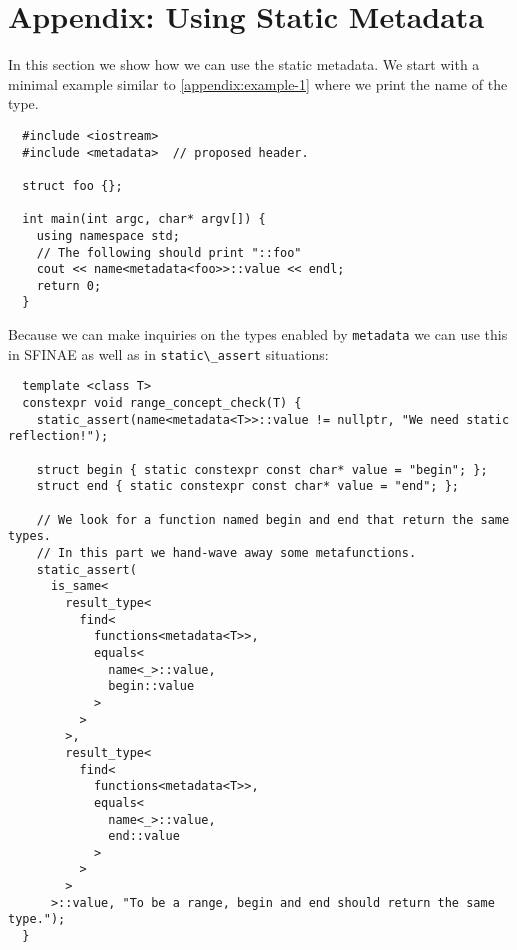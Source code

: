 \section{Appendix: Using Static Metadata}
\label{appendix:example-2}

In this section we show how we can use the static metadata. We start with a minimal example similar to \autoref{appendix:example-1} where we print the name of the type.

\begin{verbatim}
  #include <iostream>
  #include <metadata>  // proposed header.
  
  struct foo {};
  
  int main(int argc, char* argv[]) {
    using namespace std;
    // The following should print "::foo"
    cout << name<metadata<foo>>::value << endl;
    return 0;
  }
\end{verbatim}

Because we can make inquiries on the types enabled by \verb+metadata+ we can use this in SFINAE as well as in \verb+static\_assert+ situations:

\begin{verbatim}
  template <class T>
  constexpr void range_concept_check(T) {
    static_assert(name<metadata<T>>::value != nullptr, "We need static reflection!");
    
    struct begin { static constexpr const char* value = "begin"; };
    struct end { static constexpr const char* value = "end"; };
    
    // We look for a function named begin and end that return the same types.
    // In this part we hand-wave away some metafunctions.
    static_assert(
      is_same<
        result_type<
          find<
            functions<metadata<T>>,
            equals<
              name<_>::value,
              begin::value
            >
          >
        >,
        result_type<
          find<
            functions<metadata<T>>,
            equals<
              name<_>::value,
              end::value
            >
          >
        >
      >::value, "To be a range, begin and end should return the same type.");
  }
\end{verbatim}